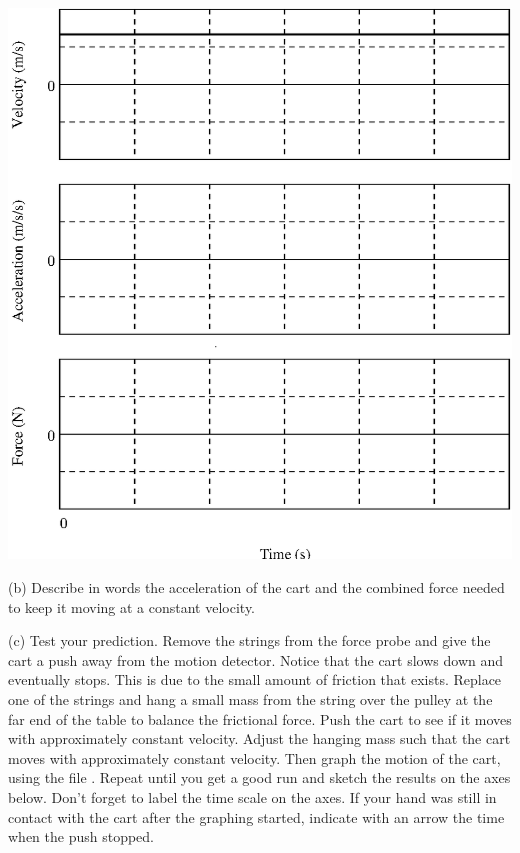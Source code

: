 \vspace{0.3cm}
{\par\centering \includegraphics{combining/combining_fig1.eps} \par}
\vspace{0.3cm}

(b) Describe in words the acceleration of the cart and the combined force needed
to keep it moving at a constant velocity.
\vspace{15mm}

(c) Test your prediction. Remove the strings from the force probe and give the
cart a push away from the motion detector. Notice that the cart slows down and
eventually stops. This is due to the small amount of friction that exists. Replace
one of the strings and hang a small mass from the string over the pulley at
the far end of the table to balance the frictional force. Push the cart to see
if it moves with approximately constant velocity. Adjust the hanging mass such
that the cart moves with approximately constant velocity. Then graph the motion
of the cart, using the file . Repeat until you get a good run and sketch the results on the axes
below. Don't forget to label the time scale on the axes. If your hand was still
in contact with the cart after the graphing started, indicate with an arrow
the time when the push stopped.


